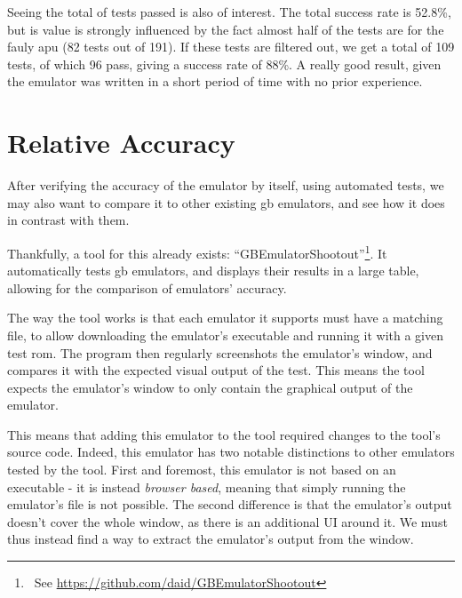 \documentclass[11pt]{report}
\newcommand{\ftnt}[1]{\footnote{~See \url{#1}}}
\begin{document}
Seeing the total of tests passed is also of interest. The total success rate is 52.8\%, but is value is strongly influenced by the fact almost half of the tests are for the fauly \gls{apu} (82 tests out of 191). If these tests are filtered out, we get a total of 109 tests, of which 96 pass, giving a success rate of 88\%. A really good result, given the emulator was written in a short period of time with no prior experience.

\section{Relative Accuracy}

After verifying the accuracy of the emulator by itself, using automated tests, we may also want to compare it to other existing \gls{gb} emulators, and see how it does in contrast with them.

Thankfully, a tool for this already exists: ``GBEmulatorShootout''\ftnt{https://github.com/daid/GBEmulatorShootout}. It automatically tests \gls{gb} emulators, and displays their results in a large table, allowing for the comparison of emulators' accuracy. 

The way the tool works is that each emulator it supports must have a matching file, to allow downloading the emulator's executable and running it with a given test \gls{rom}. The program then regularly screenshots the emulator's window, and compares it with the expected visual output of the test. This means the tool expects the emulator's window to only contain the graphical output of the emulator.

This means that adding this emulator to the tool required changes to the tool's source code. Indeed, this emulator has two notable distinctions to other emulators tested by the tool. First and foremost, this emulator is not based on an executable - it is instead \textit{browser based}, meaning that simply running the emulator's file is not possible. The second difference is that the emulator's output doesn't cover the whole window, as there is an additional UI around it. We must thus instead find a way to extract the emulator's output from the window.
\end{document}
